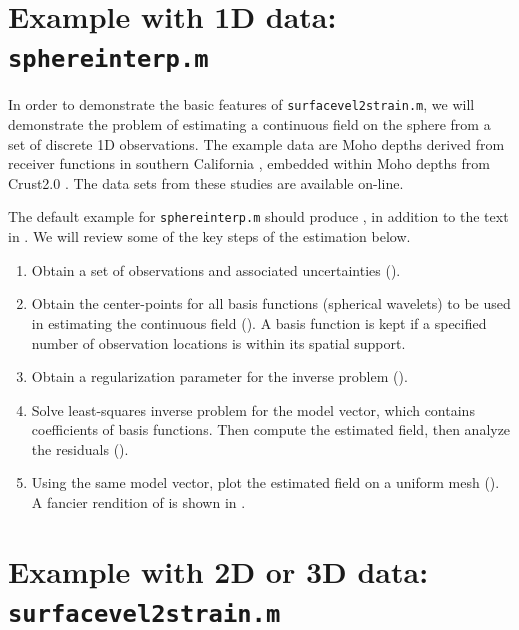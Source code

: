 \documentclass[11pt,titlepage,fleqn]{article}
\begin{document}

\pagebreak
\section{Example with 1D data: {\tt sphereinterp.m}}
\label{sec:sphereinterp}

In order to demonstrate the basic features of \verb+surfacevel2strain.m+, we will demonstrate the problem of estimating a continuous field on the sphere from a set of discrete 1D observations. The example data are Moho depths derived from receiver functions in southern California \citep{YanClayton2007}, embedded within Moho depths from Crust2.0 \citep{Crust2}. The data sets from these studies are available on-line.

The default example for \verb+sphereinterp.m+ should produce , in addition to the text in . We will review some of the key steps of the estimation below.
%
\begin{enumerate}
\item Obtain a set of observations and associated uncertainties ().
\item Obtain the center-points for all basis functions (spherical wavelets) to be used in estimating the continuous field (). A basis function is kept if a specified number of observation locations is within its spatial support.
\item Obtain a regularization parameter for the inverse problem ().
\item Solve  least-squares inverse problem for the model vector, which contains coefficients of basis functions. Then compute the estimated field, then analyze the residuals ().
\item Using the same model vector, plot the estimated field on a uniform mesh (). A fancier rendition of  is shown in .
\end{enumerate}


\section{Example with 2D or 3D data: {\tt surfacevel2strain.m}}
\label{sec:surfacevel2strain}
\end{document}
